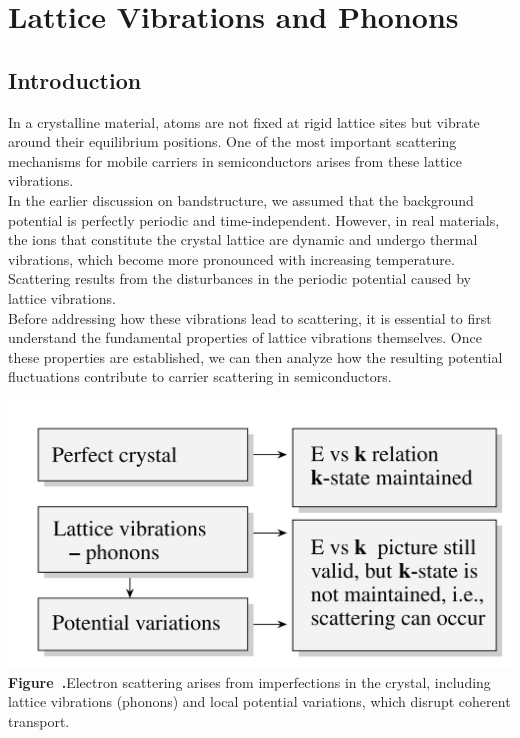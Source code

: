 \chapter{Lattice Vibrations and Phonons}

\section{Introduction}
In a crystalline material, atoms are not fixed at rigid lattice sites but vibrate around their equilibrium positions. One of the most important scattering mechanisms for mobile carriers in semiconductors arises from these lattice vibrations. \\
In the earlier discussion on bandstructure, we assumed that the background potential is perfectly periodic and time-independent. However, in real materials, the ions that constitute the crystal lattice are dynamic and undergo thermal vibrations, which become more pronounced with increasing temperature.\\
Scattering results from the disturbances in the periodic potential caused by lattice vibrations. \\
Before addressing how these vibrations lead to scattering, it is essential to first understand the fundamental properties of lattice vibrations themselves. Once these properties are established, we can then analyze how the resulting potential fluctuations contribute to carrier scattering in semiconductors.
\begin{center}
	\begin{minipage}{0.6\textwidth}
		\centering
		\includegraphics[width=\textwidth]{img/lattice_vibration_effects.png}
		\\[0.5em]
		\textbf{Figure~\thefigure.}Electron scattering arises from imperfections in the crystal, including lattice vibrations (phonons) and local potential variations, which disrupt coherent transport.
		\label{fig:Lattice_vibration_effects}
	\end{minipage}
\end{center}


